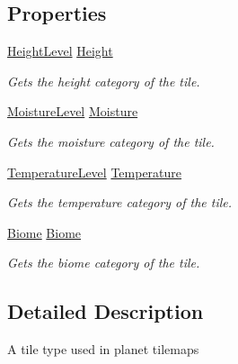 \subsection*{Properties}
\begin{DoxyCompactItemize}
\item 
\hyperlink{namespace_midnight_blue_a86f8aaa0bbb651a6a094d3eb95f799e0}{Height\+Level} \hyperlink{class_midnight_blue_1_1_planet_tile_a64d018817a484ab3b4559773b0971974}{Height}
\begin{DoxyCompactList}\small\item\em Gets the height category of the tile. \end{DoxyCompactList}\item 
\hyperlink{namespace_midnight_blue_a7428767e7fc0b52bab6cb270f8354e1d}{Moisture\+Level} \hyperlink{class_midnight_blue_1_1_planet_tile_a867d91b1185e400c608eea5e20ba4614}{Moisture}
\begin{DoxyCompactList}\small\item\em Gets the moisture category of the tile. \end{DoxyCompactList}\item 
\hyperlink{namespace_midnight_blue_a6ea6484178cbe707f25d1a0ed56db7ab}{Temperature\+Level} \hyperlink{class_midnight_blue_1_1_planet_tile_a7e2a7e01274b4ea505871b115b8534ae}{Temperature}
\begin{DoxyCompactList}\small\item\em Gets the temperature category of the tile. \end{DoxyCompactList}\item 
\hyperlink{namespace_midnight_blue_a8a6ba5637b64c3eb991f00d48decf381}{Biome} \hyperlink{class_midnight_blue_1_1_planet_tile_a56f9f50efa0b740b3ce229cb4170fd97}{Biome}
\begin{DoxyCompactList}\small\item\em Gets the biome category of the tile. \end{DoxyCompactList}\end{DoxyCompactItemize}


\subsection{Detailed Description}
A tile type used in planet tilemaps 




